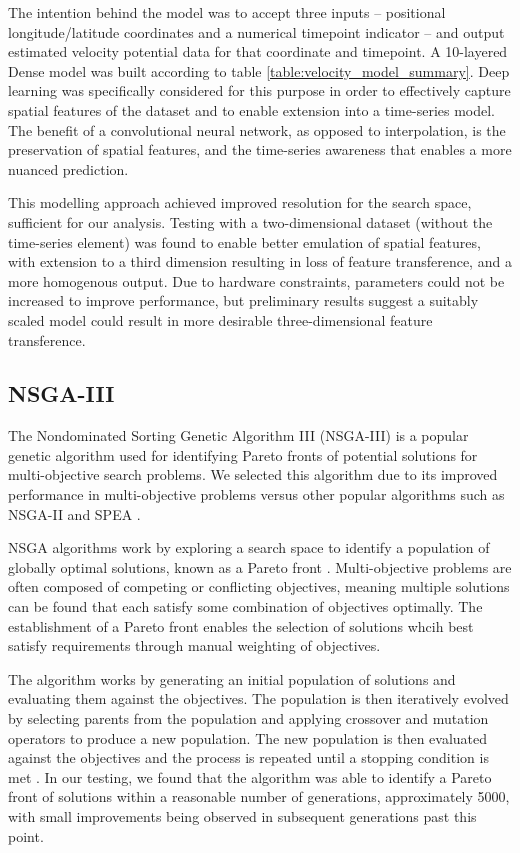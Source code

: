 \documentclass[preprint,12pt]{elsarticle}
\begin{document}
The intention behind the model was to accept three inputs – positional longitude/latitude coordinates and a numerical timepoint indicator – and output estimated velocity potential data for that coordinate and timepoint. A 10-layered Dense model was built according to table \ref{table:velocity_model_summary}. Deep learning was specifically considered for this purpose in order to effectively capture spatial features of the dataset and to enable extension into a time-series model. The benefit of a convolutional neural network, as opposed to interpolation, is the preservation of spatial features, and the time-series awareness that enables a more nuanced prediction.

This modelling approach achieved improved resolution for the search space, sufficient for our analysis. Testing with a two-dimensional dataset (without the time-series element) was found to enable better emulation of spatial features, with extension to a third dimension resulting in loss of feature transference, and a more homogenous output. Due to hardware constraints, parameters could not be increased to improve performance, but preliminary results suggest a suitably scaled model could result in more desirable three-dimensional feature transference.

\subsection{NSGA-III}
The Nondominated Sorting Genetic Algorithm III (NSGA-III) \cite{Deb2014} is a popular genetic algorithm used for identifying Pareto fronts of potential solutions for multi-objective search problems. We selected this algorithm due to its improved performance in multi-objective problems versus other popular algorithms such as NSGA-II \cite{deb2000fast} and SPEA \cite{zitzler1999multiobjective}. 

NSGA algorithms work by exploring a search space to identify a population of globally optimal solutions, known as a Pareto front \cite{van1998evolutionary}. Multi-objective problems are often composed of competing or conflicting objectives, meaning multiple solutions can be found that each satisfy some combination of objectives optimally. The establishment of a Pareto front enables the selection of solutions whcih best satisfy requirements through manual weighting of objectives.

The algorithm works by generating an initial population of solutions and evaluating them against the objectives. The population is then iteratively evolved by selecting parents from the population and applying crossover and mutation operators to produce a new population. The new population is then evaluated against the objectives and the process is repeated until a stopping condition is met \cite{Hadka2020}. In our testing, we found that the algorithm was able to identify a Pareto front of solutions within a reasonable number of generations, approximately 5000, with small improvements being observed in subsequent generations past this point.
\end{document}
